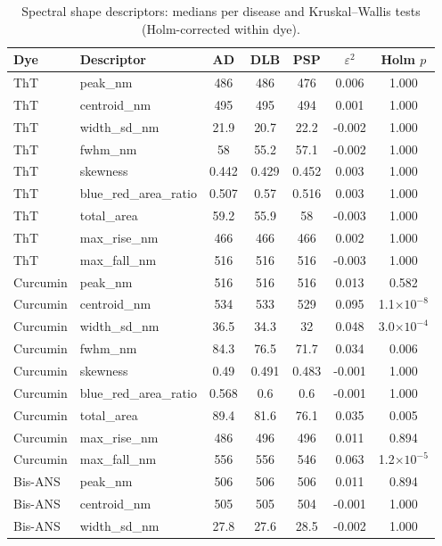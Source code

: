 \begin{table}[!htbp]
\centering\scriptsize
\caption{Spectral shape descriptors: medians per disease and Kruskal--Wallis tests (Holm-corrected within dye).}\label{tab:s_descriptors}
\begin{tabular}{llccccc}
\toprule
\textbf{Dye} & \textbf{Descriptor} & \textbf{AD} & \textbf{DLB} & \textbf{PSP} & \textbf{$\varepsilon^2$} & \textbf{Holm $p$} \\
\midrule
ThT & peak\_nm & 486 & 486 & 476 & 0.006 & 1.000 \\
ThT & centroid\_nm & 495 & 495 & 494 & 0.001 & 1.000 \\
ThT & width\_sd\_nm & 21.9 & 20.7 & 22.2 & -0.002 & 1.000 \\
ThT & fwhm\_nm & 58 & 55.2 & 57.1 & -0.002 & 1.000 \\
ThT & skewness & 0.442 & 0.429 & 0.452 & 0.003 & 1.000 \\
ThT & blue\_red\_area\_ratio & 0.507 & 0.57 & 0.516 & 0.003 & 1.000 \\
ThT & total\_area & 59.2 & 55.9 & 58 & -0.003 & 1.000 \\
ThT & max\_rise\_nm & 466 & 466 & 466 & 0.002 & 1.000 \\
ThT & max\_fall\_nm & 516 & 516 & 516 & -0.003 & 1.000 \\
Curcumin & peak\_nm & 516 & 516 & 516 & 0.013 & 0.582 \\
Curcumin & centroid\_nm & 534 & 533 & 529 & 0.095 & 1.1$\times10^{-8}$ \\
Curcumin & width\_sd\_nm & 36.5 & 34.3 & 32 & 0.048 & 3.0$\times10^{-4}$ \\
Curcumin & fwhm\_nm & 84.3 & 76.5 & 71.7 & 0.034 & 0.006 \\
Curcumin & skewness & 0.49 & 0.491 & 0.483 & -0.001 & 1.000 \\
Curcumin & blue\_red\_area\_ratio & 0.568 & 0.6 & 0.6 & -0.001 & 1.000 \\
Curcumin & total\_area & 89.4 & 81.6 & 76.1 & 0.035 & 0.005 \\
Curcumin & max\_rise\_nm & 486 & 496 & 496 & 0.011 & 0.894 \\
Curcumin & max\_fall\_nm & 556 & 556 & 546 & 0.063 & 1.2$\times10^{-5}$ \\
Bis-ANS & peak\_nm & 506 & 506 & 506 & 0.011 & 0.894 \\
Bis-ANS & centroid\_nm & 505 & 505 & 504 & -0.001 & 1.000 \\
Bis-ANS & width\_sd\_nm & 27.8 & 27.6 & 28.5 & -0.002 & 1.000 \\

\end{tabular}
\end{table}
